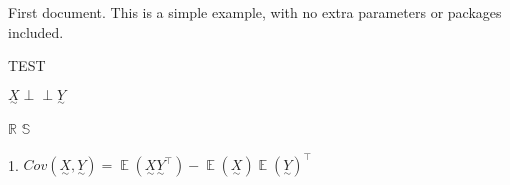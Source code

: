 \documentclass{article}
\newcommand{\statvec}[1]{\underset{\sim}{#1}} %
\DeclareMathOperator{\EX}{\mathbb{E}} %
\newcommand{\indep}{\perp\!\!\!\!\perp} %
\newcommand{\real}{\mathbb{R}} %
\begin{document}
First document. This is a simple example, with no 
extra parameters or packages included.

TEST 



$\statvec{X} \indep \statvec{Y}$

$\real$
$\mathbb{S}$

1. $Cov(\statvec{X}, \statvec{Y}) = \EX(\statvec{X}\statvec{Y}^\top) - \EX(\statvec{X})\EX(\statvec{Y})^\top$
\end{document}
